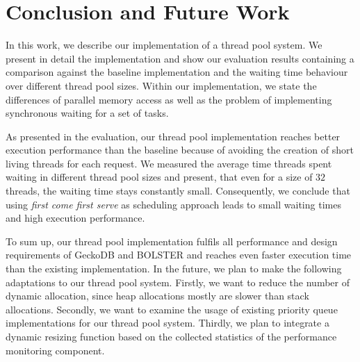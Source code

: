 \documentclass[conference]{IEEEtran}
\begin{document}
\section{Conclusion and Future Work}
In this work, we describe our implementation of a thread pool system. We present in detail the implementation and show our evaluation results containing a comparison against the baseline implementation and the waiting time behaviour over different thread pool sizes. Within our implementation, we state the differences of parallel memory access as well as the problem of implementing synchronous waiting for a set of tasks.

As presented in the evaluation, our thread pool implementation reaches better execution performance than the baseline because of avoiding the creation of short living threads for each request. We measured the average time threads spent waiting in different thread pool sizes and present, that even for a size of $32$ threads, the waiting time stays constantly small. Consequently, we conclude that using \emph{first come first serve} as scheduling approach leads to small waiting times and high execution performance. 

To sum up, our thread pool implementation fulfils all performance and design requirements of GeckoDB and BOLSTER and reaches even faster execution time than the existing implementation. In the future, we plan to make the following adaptations to our thread pool system. Firstly, we want to reduce the number of dynamic allocation, since heap allocations mostly are slower than stack allocations. Secondly, we want to examine the usage of existing priority queue implementations for our thread pool system. Thirdly, we plan to integrate a dynamic resizing function based on the collected statistics of the performance monitoring component. 



\end{document}
